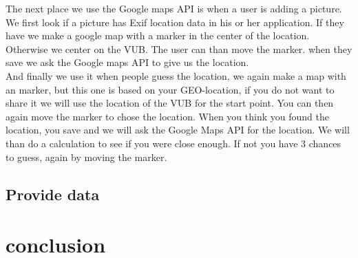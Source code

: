 \documentclass[11pt, oneside]{article}   	%
\begin{document}
The next place we use the Google maps API is when a user is adding a picture. We first look if a picture has Exif location data in his or her application. If they have we make a google map with a marker in the center of the location. Otherwise we center on the VUB. The user can than move the marker. when they save we ask the Google maps API to give us the location. \\

And finally we use it when people guess the location, we again make a map with an marker, but this one is based on your GEO-location, if you do not want to share it we will use the location of the VUB for the start point. You can then again move the marker to chose the location. When you think you found the location, you save and we will ask the Google Maps API for the location. We will than do a calculation to see if you were close enough. If not you have 3 chances to guess, again by moving the marker. \\


\subsection{Provide data}

\section{conclusion}






 
\end{document}
